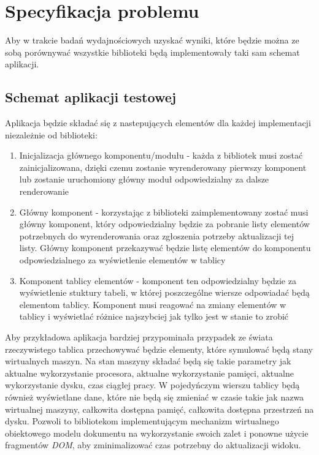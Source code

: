 \documentclass[polish, twoside, 12pt]{mwart}
\let\stdsection\section
\renewcommand*{\section}{\clearpage\stdsection}
\begin{document}
\section{Specyfikacja problemu}

Aby w trakcie badań wydajnościowych uzyskać wyniki, które będzie można ze sobą porównywać wszystkie biblioteki będą implementowały taki sam schemat aplikacji.

\subsection{Schemat aplikacji testowej}

Aplikacja będzie składać się z nastepujących elementów dla każdej implementacji niezależnie od biblioteki:

\begin{enumerate}
  \item Inicjalizacja głównego komponentu/modułu - każda z bibliotek musi zostać zainicjalizowana, dzięki czemu zostanie wyrenderowany pierwszy komponent lub zostanie uruchomiony główny moduł odpowiedzialny za dalsze renderowanie
  \item Główny komponent - korzystając z biblioteki zaimplementowany zostać musi główny komponent, który odpowiedzialny będzie za pobranie listy elementów potrzebnych do wyrenderowania oraz zgłoszenia potrzeby aktualizacji tej listy. Główny komponent przekazywać będzie listę elementów do komponentu odpowiedzialnego za wyświetlenie elementów w tablicy
  \item Komponent tablicy elementów - komponent ten odpowiedzialny będzie za wyświetlenie stuktury tabeli, w której poszczególne wiersze odpowiadać będą elementom tablicy. Komponent musi reagować na zmiany elementów w tablicy i wyświetlać różnice najszybciej jak tylko jest w stanie to zrobić
\end{enumerate}

Aby przykładowa aplikacja bardziej przypominała przypadek ze świata rzeczywistego tablica przechowywać będzie elementy, które symulować będą stany wirtualnych maszyn. Na stan maszyny składać będą się takie parametry jak aktualne wykorzystanie procesora, aktualne wykorzystanie pamięci, aktualne wykorzystanie dysku, czas ciągłej pracy. W pojedyńczym wierszu tablicy będą również wyświetlane dane, które nie będą się zmieniać w czasie takie jak nazwa wirtualnej maszyny, całkowita dostępna pamięć, całkowita dostępna przestrzeń na dysku. Pozwoli to bibliotekom implementującym mechanizm wirtualnego obiektowego modelu dokumentu na wykorzystanie swoich zalet i ponowne użycie fragmentów \emph{DOM}, aby zminimalizować czas potrzebny do aktualizacji widoku.
\end{document}
